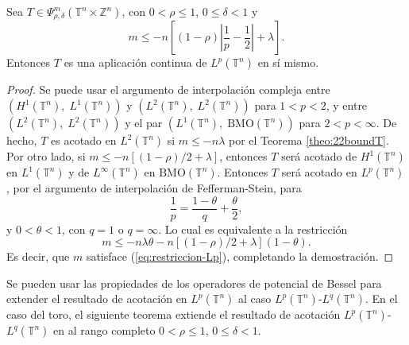 \begin{theorem}
	Sea $T \in \Psi^m_{\rho, \delta}(\mathbb{T}^n \times \mathbb{Z}^n) $, con $0 < \rho \leq 1$, $0 \leq \delta < 1$ y  
	\begin{equation}
		m \leq - n \left[(1-\rho)\left|\frac{1}{p} - \frac{1}{2}\right| + \lambda\right] .
		\label{eq:restriccion-Lp}
	\end{equation} 
	Entonces $T$ es una aplicación continua de $L^p(\mathbb{T}^n)$ en sí mismo.
	\label{teo:cotas-Lp}
\end{theorem}
\begin{proof}
	Se puede usar el argumento de interpolación compleja entre $(H^1(\mathbb{T}^n),\; L^1(\mathbb{T}^n))$ y  $(L^2(\mathbb{T}^n),\; L^2(\mathbb{T}^n))$ para $1 < p < 2$, y entre $(L^2(\mathbb{T}^n),\; L^2(\mathbb{T}^n))$ y el par $(L^1(\mathbb{T}^n),\; \mathrm{BMO}(\mathbb{T}^n))$ para $2 < p<\infty$. De hecho, $T$ es acotado en $L^2(\mathbb{T}^n)$ si $m\leq -n\lambda$ por el Teorema \ref{theo:22boundT}. Por otro lado, si $m\leq -n[(1-\rho)/2 + \lambda]$, entonces $T$ será acotado de $H^1(\mathbb{T}^n)$ en $L^1(\mathbb{T}^n)$ y de $L^\infty(\mathbb{T}^n)$ en $\mathrm{BMO}(\mathbb{T}^n)$. Entonces $T$ será acotado en $L^p(\mathbb{T}^n)$, por el argumento de interpolación de Fefferman-Stein, para
	\begin{equation*}
		\frac{1}{p} = \frac{1-\theta}{q} + \frac{\theta}{2},
	\end{equation*}
	y $0<\theta<1$, con $q=1$ o $q=\infty$. Lo cual es equivalente a la restricción 
	\begin{equation*}
		m \leq -n\lambda\theta - n\left[(1-\rho)/2 +\lambda\right](1 - \theta).
	\end{equation*}
	Es decir, que $m$ satisface (\ref{eq:restriccion-Lp}), completando la demostración.
\end{proof}
Se pueden usar las propiedades de los operadores de potencial de Bessel para extender el resultado de acotación en $L^p(\mathbb{T}^n)$ al caso $L^p(\mathbb{T}^n)$-$L^q(\mathbb{T}^n)$. En el caso del toro, el siguiente teorema extiende el resultado de acotación $L^p(\mathbb{T}^n)$-$L^q(\mathbb{T}^n)$ en  \cite{cardona-delgado-kumar} al rango completo $0 < \rho \leq 1$, $0 \leq \delta < 1$.
